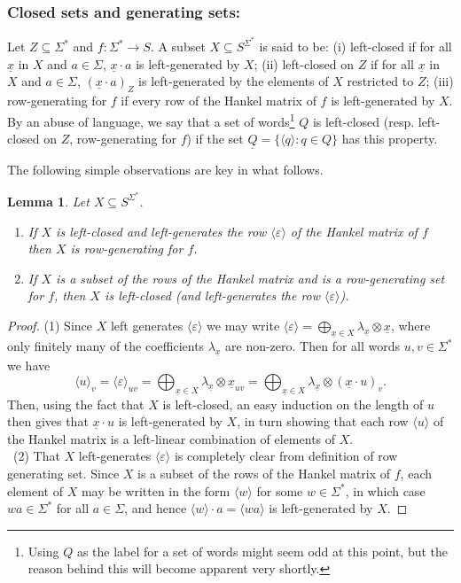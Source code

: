 \documentclass[10pt,a4paper]{amsart}
\newtheorem{lem}[thm]{Lemma}
\theoremstyle{definition}
\numberwithin{equation}{section}
\numberwithin{theorem}{section}
\begin{document}
\subsubsection*{\textbf{Closed sets and generating sets:}}
Let  $Z \subseteq \Sigma^*$ and $f: \Sigma^* \rightarrow S$. A subset $X \subseteq S^{\Sigma^*}$ is said to be: (i) left-closed if for all $\underline{x}$ in $X$ and $a \in \Sigma$, $\underline{x}\cdot a$ is left-generated by $X$; (ii) left-closed on $Z$ if for all $\underline{x}$ in $X$ and $a \in \Sigma$, $(\underline{x}\cdot a)_Z$ is left-generated by the elements of $X$ restricted to $Z$; (iii) row-generating for $f$ if every row of the Hankel matrix of $f$ is left-generated by $X$. By an abuse of language, we say that a set of words\footnote{Using $Q$ as the label for a set of words might seem odd at this point, but the reason behind this will become apparent very shortly.} $Q$ is left-closed (resp. left-closed on $Z$, row-generating for $f$) if the set $\underline{Q}=\{ \langle q \rangle: q \in Q\}$ has this property.

The following simple observations are key in what follows.
\begin{lem}
\label{lem:leftgen}
Let $X \subseteq S^{\Sigma^*}$.
\begin{enumerate}
    \item If $X$ is left-closed and left-generates the row $\langle \varepsilon \rangle$ of the Hankel matrix of $f$ then $X$ is row-generating for $f$.
    \item If $X$ is a subset of the rows of the Hankel matrix and is a row-generating set for $f$, then $X$ is left-closed (and left-generates the row $\langle \varepsilon \rangle$).
\end{enumerate}
\end{lem}
\begin{proof}
(1) Since $X$ left generates  $\langle \varepsilon \rangle$ we may write $\langle \varepsilon \rangle = \bigoplus_{\underline{x}  \in X} \lambda_{\underline{x}} \otimes \underline{x}$, where only finitely many of the coefficients $\lambda_{\underline{x}}$ are non-zero. Then for all words $u,v \in \Sigma^*$ we have $$\langle u \rangle_v = \langle \varepsilon \rangle_{uv} = \bigoplus_{\underline{x}  \in X} \lambda_{\underline{x}} \otimes \underline{x}_{uv} = \bigoplus_{\underline{x}  \in X} \lambda_{\underline{x}} \otimes (\underline{x} \cdot u)_v.$$
Then, using the fact that $X$ is left-closed, an easy induction on the length of $u$ then gives that $\underline{x}\cdot u$ is left-generated by $X$, in turn showing that each row  $\langle u \rangle$ of the Hankel matrix is a left-linear combination of elements of $X$.\\ \ 
(2) That $X$ left-generates $\langle \varepsilon \rangle$ is completely clear from definition of row generating set. Since $X$ is a subset of the rows of the Hankel matrix of $f$, each element of $X$ may be written in the form $\langle w \rangle$ for some $w \in \Sigma^*$, in which case $wa \in \Sigma^*$ for all $a \in \Sigma$, and hence $\langle w \rangle\cdot a = \langle wa \rangle$ is left-generated by $X$.
\end{proof}
\end{document}
